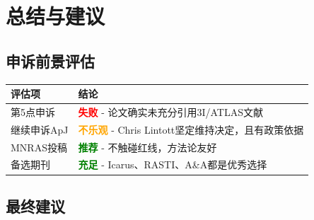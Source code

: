 \documentclass[12pt,a4paper]{article}
\begin{document}
\newpage
\section{总结与建议}

\subsection{申诉前景评估}

\begin{center}
\begin{tabular}{|p{4cm}|p{9cm}|}
\hline
\rowcolor{gray!20}
\textbf{评估项} & \textbf{结论} \\
\hline
第5点申诉 & \textcolor{red}{\textbf{失败}} - 论文确实未充分引用3I/ATLAS文献 \\
\hline
继续申诉ApJ & \textcolor{orange}{\textbf{不乐观}} - Chris Lintott坚定维持决定，且有政策依据 \\
\hline
MNRAS投稿 & \textcolor{green}{\textbf{推荐}} - 不触碰红线，方法论友好 \\
\hline
备选期刊 & \textcolor{green}{\textbf{充足}} - Icarus、RASTI、A\&A都是优秀选择 \\
\hline
\end{tabular}
\end{center}

\subsection{最终建议}
\end{document}
